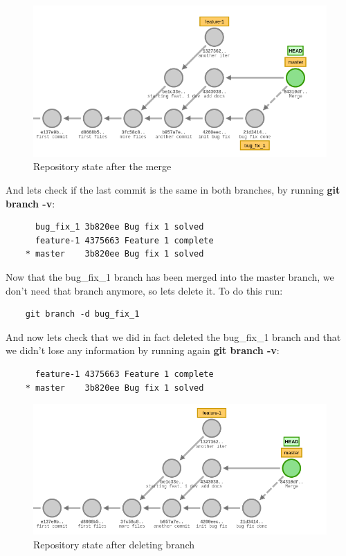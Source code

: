 \documentclass{article}
\begin{document}
\begin{figure}[H]
\centerline{\includegraphics[scale=0.5]{repository_after_merge.png}}
\caption{Repository state after the merge}
\label{fig1}
\end{figure}

And lets check if the last commit is the same in both branches, by running \textbf{git branch -v}:

\begin{lstlisting}
	  bug_fix_1 3b820ee Bug fix 1 solved
	  feature-1 4375663 Feature 1 complete
	* master    3b820ee Bug fix 1 solved
\end{lstlisting}

Now that the bug\_fix\_1 branch has been merged into the master branch, we don't need that branch anymore, so lets delete it. To do this run:

\begin{lstlisting}
	git branch -d bug_fix_1
\end{lstlisting}

And now lets check that we did in fact deleted the bug\_fix\_1 branch and that we didn't lose any information by running again \textbf{git branch -v}:

\begin{lstlisting}
	  feature-1 4375663 Feature 1 complete
	* master    3b820ee Bug fix 1 solved
\end{lstlisting}

\begin{figure}[H]
\centerline{\includegraphics[scale=0.5]{repository_after_deleting_branch.png}}
\caption{Repository state after deleting branch}
\label{fig1}
\end{figure}
\end{document}
